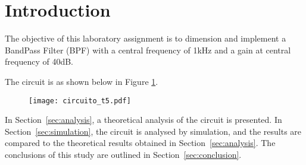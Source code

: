 \section{Introduction}
\label{sec:introduction}

The objective of this laboratory assignment is to dimension and implement a BandPass Filter (BPF) with a central frequency of 1kHz and a gain at central frequency of 40dB.

The circuit is as shown below in Figure \ref{fig:circuito_t5}.

\begin{figure}[h]
\centering
  \texttt{[image: circuito\_t5.pdf]}
  \label{fig:circuito_t5}
\end{figure}

In Section~\ref{sec:analysis}, a theoretical analysis of the circuit is
presented. In Section~\ref{sec:simulation}, the circuit is analysed by
simulation, and the results are compared to the theoretical results obtained in
Section~\ref{sec:analysis}. The conclusions of this study are outlined in
Section~\ref{sec:conclusion}.
